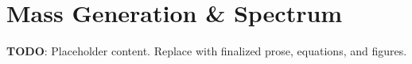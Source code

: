 \section{Mass Generation \& Spectrum}
\label{sec:mass-generation-spectrum}

\textbf{TODO}: Placeholder content. Replace with finalized prose, equations, and figures.

